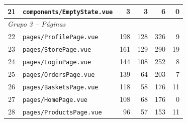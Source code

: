 \begin{table}[htb]
\begin{tabular}{clrrrr}
		21 & \texttt{components/EmptyState.vue} & 3 & 3 & 6 & 0 \\
		\hline
		\multicolumn{6}{l}{\textit{Grupo 3 -- Páginas}} \\
		22 & \texttt{pages/ProfilePage.vue} & 198 & 128 & 326 & 9 \\
		23 & \texttt{pages/StorePage.vue} & 161 & 129 & 290 & 19 \\
		24 & \texttt{pages/LoginPage.vue} & 144 & 108 & 252 & 8 \\
		25 & \texttt{pages/OrdersPage.vue} & 139 & 64 & 203 & 7 \\
		26 & \texttt{pages/BasketsPage.vue} & 118 & 58 & 176 & 11 \\
		27 & \texttt{pages/HomePage.vue} & 108 & 68 & 176 & 0 \\
		28 & \texttt{pages/ProductsPage.vue} & 96 & 57 & 153 & 11 \\
		\hline
	\end{tabular}
\end{table}

